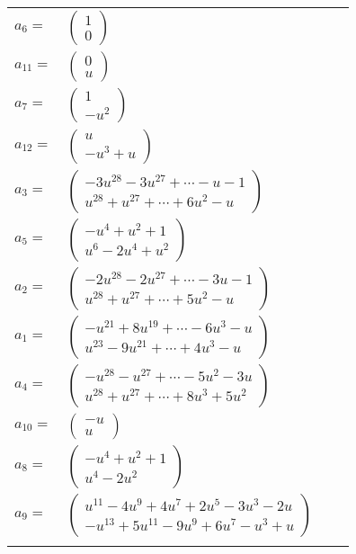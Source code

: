 \documentclass[1p]{elsarticle_modified}
\theoremstyle{definition}
\begin{document}
\begin{tabular}{m{7pt} m{180pt} m{7pt} m{180pt} }
\flushright $a_{6}=$&$\begin{pmatrix}1\\0\end{pmatrix}$ \\
\flushright $a_{11}=$&$\begin{pmatrix}0\\u\end{pmatrix}$ \\
\flushright $a_{7}=$&$\begin{pmatrix}1\\- u^2\end{pmatrix}$ \\
\flushright $a_{12}=$&$\begin{pmatrix}u\\- u^3+u\end{pmatrix}$ \\
\flushright $a_{3}=$&$\begin{pmatrix}-3 u^{28}-3 u^{27}+\cdots- u-1\\u^{28}+u^{27}+\cdots+6 u^2- u\end{pmatrix}$ \\
\flushright $a_{5}=$&$\begin{pmatrix}- u^4+u^2+1\\u^6-2 u^4+u^2\end{pmatrix}$ \\
\flushright $a_{2}=$&$\begin{pmatrix}-2 u^{28}-2 u^{27}+\cdots-3 u-1\\u^{28}+u^{27}+\cdots+5 u^2- u\end{pmatrix}$ \\
\flushright $a_{1}=$&$\begin{pmatrix}- u^{21}+8 u^{19}+\cdots-6 u^3- u\\u^{23}-9 u^{21}+\cdots+4 u^3- u\end{pmatrix}$ \\
\flushright $a_{4}=$&$\begin{pmatrix}- u^{28}- u^{27}+\cdots-5 u^2-3 u\\u^{28}+u^{27}+\cdots+8 u^3+5 u^2\end{pmatrix}$ \\
\flushright $a_{10}=$&$\begin{pmatrix}- u\\u\end{pmatrix}$ \\
\flushright $a_{8}=$&$\begin{pmatrix}- u^4+u^2+1\\u^4-2 u^2\end{pmatrix}$ \\
\flushright $a_{9}=$&$\begin{pmatrix}u^{11}-4 u^9+4 u^7+2 u^5-3 u^3-2 u\\- u^{13}+5 u^{11}-9 u^9+6 u^7- u^3+u\end{pmatrix}$\\&\end{tabular}
\end{document}
